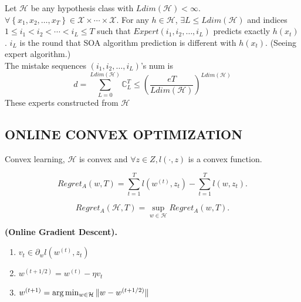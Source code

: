 Let $ \mathcal{H} $ be any hypothesis class with $ Ldim(\mathcal{H}) < \infty $. $\forall \left\{ x_1, x_2, \ldots, x_T \right\} \in \mathcal{X} \times \cdots \times \mathcal{X} $. For any $ h \in \mathcal{H} $, $ \exists L \le Ldim(\mathcal{H}) $ and indices $ 1 \le i_1 < i_2 < \cdots < i_L \le T $ such that $ Expert(i_1, i_2, \ldots, i_L) $ predicts exactly $ h(x_t) $. $ i_L $ is the round that SOA algorithm prediction is different with $ h(x_t) $. (Seeing expert algorithm.)\\
The mistake sequences $ (i_1, i_2, \ldots, i_L) $'s num is
\[
    d = \sum^{Ldim(\mathcal{H})}_{L=0} \mathbb{C}^T_{L} \le {\left( \frac{eT}{Ldim(\mathcal{H})}  \right)}^{Ldim(\mathcal{H})} 
\]
These experts constructed from $ \mathcal{H} $ 


\subsection{ONLINE CONVEX OPTIMIZATION}%
\label{sub:online_convex_optimization}

Convex learning, $ \mathcal{H} $ is convex and $ \forall z \in Z, l(\cdot, z) $ is a convex function.

\[
    Regret_A(w, T) = \sum^{T}_{t=1} l(w^{(t)}, z_t) - \sum^{T}_{t=1} l(w, z_t).
\]

\[
    Regret_A(\mathcal{H}, T) = \sup_{w \in \mathcal{H}} Regret_A(w, T).
\]

\begin{definition}
    \textbf{(Online Gradient Descent).}
    \begin{enumerate}
        \item $ v_t \in \partial_{w} l(w^{(t)}, z_t) $
        \item $ w^{(t+1/2)} = w^{(t)} - \eta v_t $
        \item $ w^{(t+1)} = \arg\min_{w \in \mathcal{H}} \Arrowvert w - w^{(t+1/2)} \Arrowvert $
    \end{enumerate}
\end{definition}

